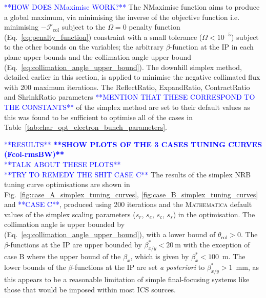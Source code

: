 \documentclass[../main.tex]{subfiles}
\begin{document}
\textcolor{blue}{**HOW DOES NMaximise WORK?**}
The NMaximise function aims to produce a global maximum, via minimising the inverse of the objective function i.e. minimising $-\mathcal{F}_{\mathrm{col}}$ subject to the $\Omega = 0$ penalty function (Eq.~\ref{eq:penalty_function}) constraint with a small tolerance ($\Omega < 10^{-5}$) subject to the other bounds on the variables; the arbitrary $\beta$-function at the IP in each plane upper bounds and the collimation angle upper bound (Eq.~\ref{eq:collimation_angle_upper_bound}). The downhill simplex method, detailed earlier in this section, is applied to minimise the negative collimated flux with 200 maximum iterations. The ReflectRatio, ExpandRatio, ContractRatio and ShrinkRatio parameters \textcolor{blue}{**MENTION THAT THESE CORRESPOND TO THE CONSTANTS**} \cite{wolfram2021nmaximize} of the simplex method are set to their default values as this was found to be sufficient to optimise all of the cases in Table~\ref{tab:char_opt_electron_bunch_parameters}.

\textcolor{blue}{**RESULTS**}
\textcolor{blue}{\textbf{**SHOW PLOTS OF THE 3 CASES TUNING CURVES (Fcol-rmsBW)**} \\ **TALK ABOUT THESE PLOTS** \\ **TRY TO REMEDY THE SHIT CASE C**}
The results of the simplex NRB tuning curve optimisations are shown in Fig.~\ref{fig:case_A_simplex_tuning_curves}, \ref{fig:case_B_simplex_tuning_curves} and \textcolor{blue}{**CASE C**}, produced using 200 iterations and the \textsc{Mathematica} \cite{wolfram2021nmaximize} default values of the simplex scaling parameters ($s_{r}$, $s_{e}$, $s_{c}$, $s_{s}$) in the optimisation. The collimation angle is upper bounded by (Eq.~\ref{eq:collimation_angle_upper_bound}), with a lower bound of $\theta_{\mathrm{col}} > 0$. The $\beta$-functions at the IP are upper bounded by  $\beta_{x/y}^{*} < 20~\mathrm{\si{\meter}}$ with the exception of case B where the upper bound of the $\beta_{x}$, which is given by $\beta_{x}^{*} < 100$~\si{\meter}. The lower bounds of the $\beta$-functions at the IP are set \textit{a posteriori} to $\beta_{x/y}^{*} > 1$~\si{\milli\meter}, as this appears to be a reasonable limitation of simple final-focusing systems like those that would be imposed within most ICS sources. 
\end{document}
